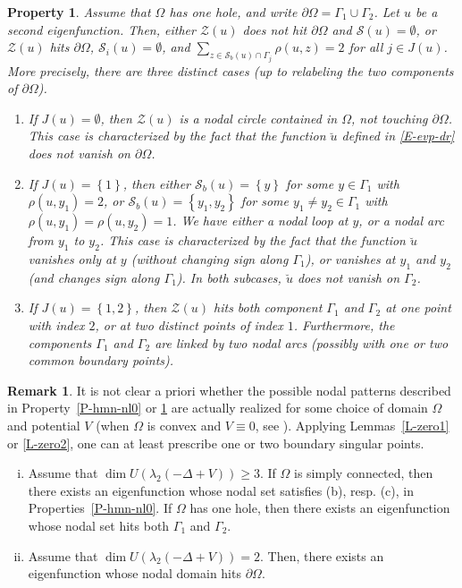 \documentclass[12pt,a4paper]{amsart}
\theoremstyle{plain} %
\newtheorem{property}[theorem]{Property}
\theoremstyle{definition}
\newtheorem{remark}[theorem]{Remark}
\numberwithin{equation}{section}
\numberwithin{figure}{section}
\numberwithin{table}{section}
\newcommand{\cS}{\mathcal{S}}
\newcommand{\cZ}{\mathcal{Z}}
\newcommand{\set}[1]{\left\lbrace #1 \right\rbrace}
\begin{document}
{\begin{property}\label{P-hmn-nl1}
Assume that $\Omega$ has \emph{one hole}, and write $\partial \Omega = \Gamma_1 \cup \Gamma_2$. Let $u$ be a second eigenfunction. Then, either $\cZ(u)$ does not hit $\partial \Omega$ and $\cS(u) = \emptyset$, or $\cZ(u)$ hits $\partial \Omega$, $\cS_i(u) = \emptyset$, and $\sum_{z\in \cS_b(u)\cap \Gamma_j} \rho(u,z) = 2$ for all $j \in J(u)$. More precisely, there are three distinct cases (up to relabeling the two components of $\partial \Omega$).
\begin{enumerate}[(1)]
  \item If $J(u) = \emptyset$, then $\cZ(u)$ is a nodal circle contained in $\Omega$, not touching $\partial \Omega$. This case is characterized by the fact that the function $\breve{u}$  defined in \eqref{E-evp-dr} does not vanish on $\partial \Omega$.
  \item If $J(u) = \set{1}$, then either $\cS_b(u) = \set{y}$ for some $y \in  \Gamma_1$ with $\rho(u,y_1)=2$, or $\cS_b(u) = \set{y_1,y_2}$ for some $y_1 \neq y_2 \in  \Gamma_1$ with $\rho(u,y_1)=\rho(u,y_2)=1$. We have either a nodal loop at $y$, or a nodal arc from $y_1$ to $y_2$.  This case is characterized by the fact that the function $\breve{u}$ vanishes only at $y$ (without changing sign along $\Gamma_1$), or vanishes at $y_1$ and $y_2$ (and changes sign along $\Gamma_1$). In both subcases, $\breve{u}$ does not vanish on $\Gamma_2$.
  \item If $J(u) = \set{1,2}$,  then $\cZ(u)$ hits both component $\Gamma_1$ and $\Gamma_2$ at one point with index $2$, or at two distinct points of index $1$. Furthermore, the components $\Gamma_1$ and $\Gamma_2$ are linked by two nodal arcs (possibly with one or two common boundary points).
\end{enumerate}
\end{property}%

\begin{remark}\label{R-hmn0-24}\phantom{}
It is not clear  a priori whether the possible nodal patterns described in Property~\ref{P-hmn-nl0} or \ref{P-hmn-nl1} are actually realized for some choice of domain $\Omega$ and potential $V$ (when $\Omega$ is convex and $V\equiv 0$, see \cite{Ales1994}). Applying Lemmas~\ref{L-zero1} or \ref{L-zero2}, one can at least prescribe one or two boundary singular points.
\begin{enumerate}[(i)]
\item Assume that $\dim U(\lambda_2(-\Delta+V)) \ge 3$. If $\Omega$ is simply connected, then there exists an eigenfunction whose nodal set satisfies (b), resp. (c), in Properties~\ref{P-hmn-nl0}. If $\Omega$ has one hole, then there exists an eigenfunction whose nodal set hits both $\Gamma_1$ and $\Gamma_2$.
  \item Assume that $\dim U(\lambda_2(-\Delta+V)) = 2$. Then, there exists an eigenfunction whose nodal domain hits $\partial \Omega$.
\end{enumerate}
\end{remark}%

}
\end{document}
